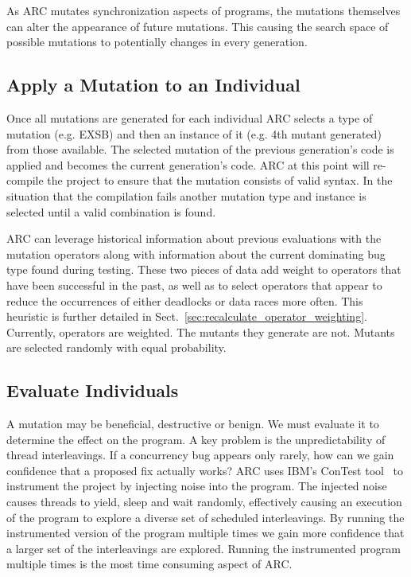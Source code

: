 \documentclass{llncs}
\begin{document}
As ARC mutates synchronization aspects of programs, the mutations themselves
can alter the appearance of future mutations. This causing the search space of
possible mutations to potentially changes in every generation.

\subsection{Apply a Mutation to an Individual}
\label{sec:mutate_individuals}

Once all mutations are generated for each individual ARC selects a type of
mutation (e.g. EXSB) and then an instance of  
it (e.g. 4th mutant generated) from those available. The
selected mutation of the previous generation's code is applied and becomes the current
generation's code. ARC at this point will re-compile the project to ensure that
the mutation consists of valid syntax. In the situation that the compilation
fails another mutation type and instance is selected until a valid combination is
found.

ARC can leverage historical information about previous evaluations with the
mutation operators along with information about the current dominating bug type
found during testing. These two pieces of data add weight to operators
that have been successful in the past, as well as to select operators that
appear to reduce the occurrences of either deadlocks or data races more often.
This heuristic is further detailed in
Sect.~\ref{sec:recalculate_operator_weighting}. Currently, operators are weighted.
The mutants they generate are not.  Mutants are selected randomly with equal
probability.

\subsection{Evaluate Individuals}
\label{sec:evalute_individuals}

A mutation may be beneficial, destructive or benign. We must evaluate it to
determine the effect on the program. A key problem is the unpredictability of
thread interleavings. If a concurrency bug appears only rarely, how can we gain
confidence that a proposed fix actually works? ARC uses IBM's ConTest
tool~\cite{EFN+02} to instrument the project by injecting noise into the
program. The injected noise causes threads to yield, sleep and wait randomly,
effectively causing an execution of the program to explore a diverse set of
scheduled interleavings. By running the instrumented version of the
program multiple times we gain more confidence that a larger set of the
interleavings are explored. Running the instrumented program multiple times is
the most time consuming aspect of ARC.
\end{document}
